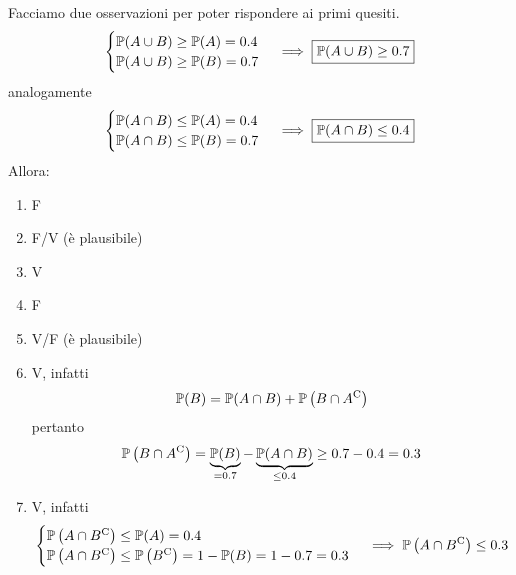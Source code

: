 Facciamo due osservazioni per poter rispondere ai primi quesiti.
\begin{equation*}
	\begin{cases}
		\mathbb{P}(A\cup B) \geq \mathbb{P}(A) =0.4\\
		\mathbb{P}(A\cup B) \geq \mathbb{P}(B) =0.7
	\end{cases}
	\implies \boxed{\mathbb{P}( A\cup B) \geq 0.7}
\end{equation*}
analogamente
\begin{equation*}
	\begin{cases}
		\mathbb{P}( A\cap B) \leq \mathbb{P}( A) =0.4\\
		\mathbb{P}( A\cap B) \leq \mathbb{P}( B) =0.7
	\end{cases}
	\implies \boxed{\mathbb{P}( A\cap B) \leq 0.4}
\end{equation*}
Allora:
\begin{enumerate}
	\item F
	\item F/V (è plausibile)
	\item V
	\item F
	\item V/F (è plausibile)
	\item V, infatti
	\begin{equation*}
		\mathbb{P}( B) =\mathbb{P}( A\cap B) +\mathbb{P}\left( B\cap A^{\mathrm{C}}\right)
	\end{equation*}
	pertanto
	\begin{equation*}
		\mathbb{P}\left( B\cap A^{\mathrm{C}}\right) =\underbrace{\mathbb{P}( B)}_{=0.7} -\underbrace{\mathbb{P}( A\cap B)}_{\leq 0.4} \geq 0.7-0.4=0.3
	\end{equation*}
	\item V, infatti
	\begin{equation*}
		\begin{cases}
			\mathbb{P}\left( A\cap B^{\mathrm{C}}\right) \leq \mathbb{P}( A) =0.4\\
			\mathbb{P}\left( A\cap B^{\mathrm{C}}\right) \leq \mathbb{P}\left( B^{\mathrm{C}}\right) =1-\mathbb{P}( B) =1-0.7=0.3
		\end{cases}
		\implies \mathbb{P}\left( A\cap B^{\mathrm{C}}\right) \leq 0.3
	\end{equation*}
\end{enumerate}

\Soluzione

